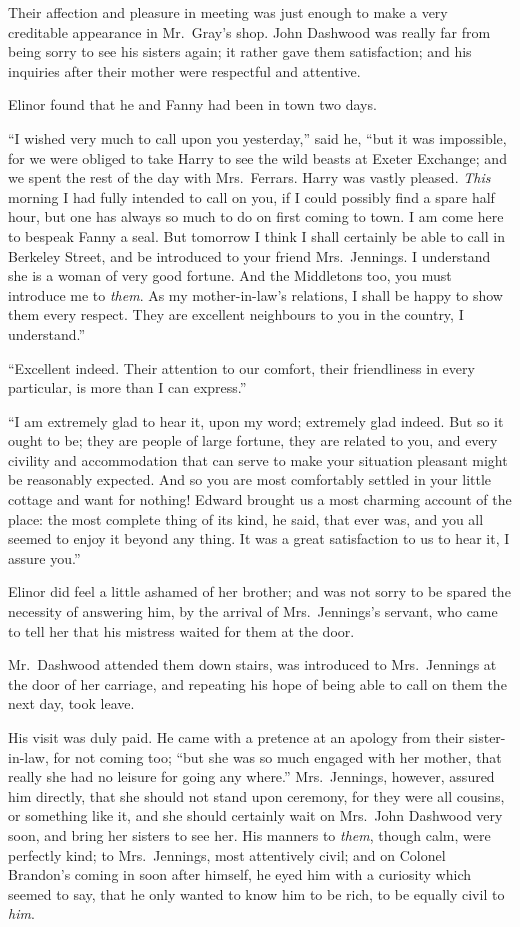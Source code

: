 Their affection and pleasure in meeting was just enough
to make a very creditable appearance in Mr.\ Gray's shop.
John Dashwood was really far from being sorry to see
his sisters again; it rather gave them satisfaction;
and his inquiries after their mother were respectful
and attentive.

Elinor found that he and Fanny had been in town
two days.

``I wished very much to call upon you yesterday,''
said he, ``but it was impossible, for we were obliged
to take Harry to see the wild beasts at Exeter Exchange;
and we spent the rest of the day with Mrs.\ Ferrars.
Harry was vastly pleased.  \emph{This} morning I had fully intended
to call on you, if I could possibly find a spare half hour,
but one has always so much to do on first coming to town.
I am come here to bespeak Fanny a seal.  But tomorrow I
think I shall certainly be able to call in Berkeley Street,
and be introduced to your friend Mrs.\ Jennings.
I understand she is a woman of very good fortune.
And the Middletons too, you must introduce me to \emph{them}.
As my mother-in-law's relations, I shall be happy to show
them every respect.  They are excellent neighbours to you in
the country, I understand.''

``Excellent indeed.  Their attention to our comfort,
their friendliness in every particular, is more than I
can express.''

``I am extremely glad to hear it, upon my word;
extremely glad indeed.  But so it ought to be; they are
people of large fortune, they are related to you, and
every civility and accommodation that can serve to make
your situation pleasant might be reasonably expected.
And so you are most comfortably settled in your little cottage
and want for nothing!  Edward brought us a most charming
account of the place: the most complete thing of its kind,
he said, that ever was, and you all seemed to enjoy it beyond
any thing.  It was a great satisfaction to us to hear it,
I assure you.''

Elinor did feel a little ashamed of her brother;
and was not sorry to be spared the necessity of answering him,
by the arrival of Mrs.\ Jennings's servant, who came to tell
her that his mistress waited for them at the door.

Mr.\ Dashwood attended them down stairs, was introduced
to Mrs.\ Jennings at the door of her carriage, and repeating
his hope of being able to call on them the next day,
took leave.

His visit was duly paid.  He came with a pretence at
an apology from their sister-in-law, for not coming too;
``but she was so much engaged with her mother, that really
she had no leisure for going any where.''  Mrs.\ Jennings,
however, assured him directly, that she should not stand
upon ceremony, for they were all cousins, or something
like it, and she should certainly wait on Mrs.\ John
Dashwood very soon, and bring her sisters to see her.
His manners to \emph{them}, though calm, were perfectly kind;
to Mrs.\ Jennings, most attentively civil; and on Colonel
Brandon's coming in soon after himself, he eyed him with a
curiosity which seemed to say, that he only wanted to know
him to be rich, to be equally civil to \emph{him}.

